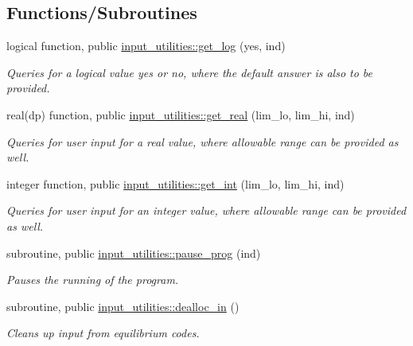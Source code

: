 \subsection*{Functions/\+Subroutines}
\begin{DoxyCompactItemize}
\item 
logical function, public \hyperlink{namespaceinput__utilities_ad9ce824c30b32041ab70f3fb191f06db}{input\+\_\+utilities\+::get\+\_\+log} (yes, ind)
\begin{DoxyCompactList}\small\item\em Queries for a logical value yes or no, where the default answer is also to be provided. \end{DoxyCompactList}\item 
real(dp) function, public \hyperlink{namespaceinput__utilities_a41fc0c806e12bc722771210cfa1edbd3}{input\+\_\+utilities\+::get\+\_\+real} (lim\+\_\+lo, lim\+\_\+hi, ind)
\begin{DoxyCompactList}\small\item\em Queries for user input for a real value, where allowable range can be provided as well. \end{DoxyCompactList}\item 
integer function, public \hyperlink{namespaceinput__utilities_a03e09af96ba6f7e187ea4a1d9b743148}{input\+\_\+utilities\+::get\+\_\+int} (lim\+\_\+lo, lim\+\_\+hi, ind)
\begin{DoxyCompactList}\small\item\em Queries for user input for an integer value, where allowable range can be provided as well. \end{DoxyCompactList}\item 
subroutine, public \hyperlink{namespaceinput__utilities_a71bd36f063d55ab62c7a37864aef1185}{input\+\_\+utilities\+::pause\+\_\+prog} (ind)
\begin{DoxyCompactList}\small\item\em Pauses the running of the program. \end{DoxyCompactList}\item 
subroutine, public \hyperlink{namespaceinput__utilities_aa0cf7578f9c9ab6470f8bb8d025f1daf}{input\+\_\+utilities\+::dealloc\+\_\+in} ()
\begin{DoxyCompactList}\small\item\em Cleans up input from equilibrium codes. \end{DoxyCompactList}\end{DoxyCompactItemize}
